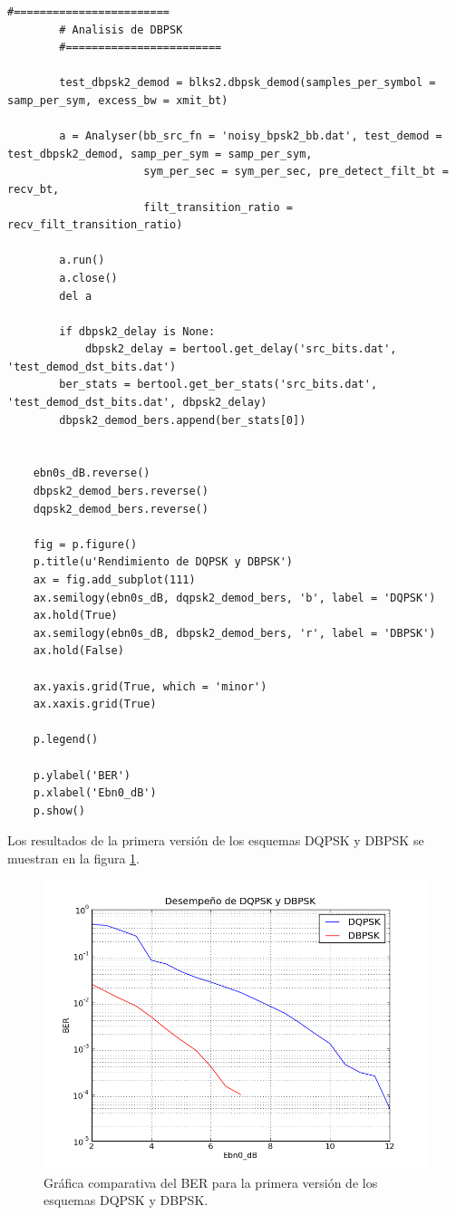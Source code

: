 \begin{lstlisting}[float=hp, label=ex:mainber, caption={C\'odigo \emph{Python} de la rutina principal del
an\'alisis del BER.}, breaklines=true]
        #========================
        # Analisis de DBPSK
        #========================

        test_dbpsk2_demod = blks2.dbpsk_demod(samples_per_symbol = samp_per_sym, excess_bw = xmit_bt)

        a = Analyser(bb_src_fn = 'noisy_bpsk2_bb.dat', test_demod = test_dbpsk2_demod, samp_per_sym = samp_per_sym,
                     sym_per_sec = sym_per_sec, pre_detect_filt_bt = recv_bt,
                     filt_transition_ratio = recv_filt_transition_ratio)

        a.run()
        a.close()
        del a

        if dbpsk2_delay is None:
            dbpsk2_delay = bertool.get_delay('src_bits.dat', 'test_demod_dst_bits.dat')
        ber_stats = bertool.get_ber_stats('src_bits.dat', 'test_demod_dst_bits.dat', dbpsk2_delay)
        dbpsk2_demod_bers.append(ber_stats[0])


    ebn0s_dB.reverse()
    dbpsk2_demod_bers.reverse()
    dqpsk2_demod_bers.reverse()

    fig = p.figure()
    p.title(u'Rendimiento de DQPSK y DBPSK')
    ax = fig.add_subplot(111)
    ax.semilogy(ebn0s_dB, dqpsk2_demod_bers, 'b', label = 'DQPSK')
    ax.hold(True)
    ax.semilogy(ebn0s_dB, dbpsk2_demod_bers, 'r', label = 'DBPSK')
    ax.hold(False)

    ax.yaxis.grid(True, which = 'minor')
    ax.xaxis.grid(True)

    p.legend()

    p.ylabel('BER')
    p.xlabel('Ebn0_dB')
    p.show()
\end{lstlisting}

Los resultados de la primera versi\'on de los esquemas DQPSK y DBPSK se muestran en la figura
\ref{fig:bernormal}.

\begin{figure}[htp]
  \centering
  \includegraphics[scale=0.7]{figs/bernormal}
  \caption{Gr\'afica comparativa del BER para la primera versi\'on de los esquemas DQPSK y DBPSK.}
  \label{fig:bernormal}
\end{figure}

